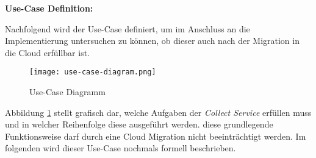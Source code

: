 \textbf{Use-Case Definition:}

Nachfolgend wird der Use-Case definiert, um im Anschluss an die Implementierung untersuchen zu können, ob dieser auch nach der Migration in die Cloud erfüllbar ist.

\begin{figure}[H]
    \centering
    \texttt{[image: use-case-diagram.png]}
    \caption{Use-Case Diagramm}
    \label{fig:use-case-diagram}
\end{figure}

Abbildung \ref{fig:use-case-diagram} stellt grafisch dar, welche Aufgaben der \textit{Collect Service} erfüllen muss und in welcher Reihenfolge diese ausgeführt werden. diese grundlegende Funktionsweise darf durch eine Cloud Migration nicht beeinträchtigt werden. Im folgenden wird dieser Use-Case nochmals formell beschrieben.


